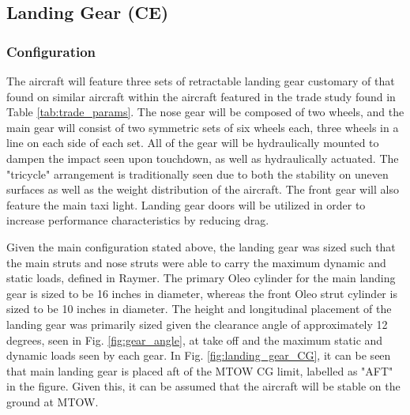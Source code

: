 \FloatBarrier
\subsection{Landing Gear (\textbf{CE})}
\label{section: Landing Gear}
\subsubsection{Configuration}
The aircraft will feature three sets of retractable landing gear customary of that found on similar aircraft within the aircraft featured in the trade study found in Table \ref{tab:trade_params}. The nose gear will be composed of two wheels, and the main gear will consist of two symmetric sets of six wheels each, three wheels in a line on each side of each set. All of the gear will be hydraulically mounted to dampen the impact seen upon touchdown, as well as hydraulically actuated. The "tricycle" arrangement is traditionally seen due to both the stability on uneven surfaces as well as the weight distribution of the aircraft.  The front gear will also feature the main taxi light. Landing gear doors will be utilized in order to increase performance characteristics by reducing drag. 

Given the main configuration stated above, the landing gear was sized such that the main struts and nose struts were able to carry the maximum dynamic and static loads, defined in Raymer. \cite{raymer} The primary Oleo cylinder for the main landing gear is sized to be 16 inches in diameter, whereas the front Oleo strut cylinder is sized to be 10 inches in diameter. The height and longitudinal placement of the landing gear was primarily sized given the clearance angle of approximately 12 degrees, seen in Fig. \ref{fig:gear_angle}, at take off and the maximum static and dynamic loads seen by each gear. \cite{raymer} In Fig. \ref{fig:landing_gear_CG}, it can be seen that main landing gear is placed aft of the MTOW CG limit, labelled as "AFT" in the figure. Given this, it can be assumed that the aircraft will be stable on the ground at MTOW.

